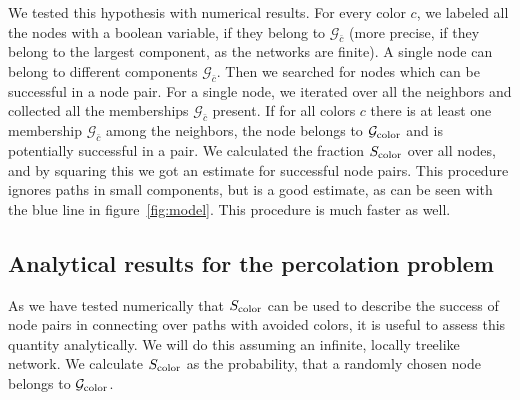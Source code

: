 \documentclass[aps, pre, onecolumn, a4paper, floatfix]{revtex4}
\begin{document}
We tested this hypothesis with numerical results. For every color $c$, we labeled all the 
nodes with a boolean variable, if they belong to ${\mathcal G}_{\bar c}$ (more precise, if they 
belong to the largest component, as the networks are finite). A single node can 
belong to different components ${\mathcal G}_{\bar c}$. Then we searched for 
nodes which can be successful in a node pair. For a single node, we iterated over 
all the neighbors and collected all the memberships ${\mathcal G}_{\bar c}$ present. If for 
all colors $c$ there is at least one membership ${\mathcal G}_{\bar c}$ among the neighbors, 
the node belongs to ${\mathcal G}_{\rm color}$ and is
potentially successful in a pair. We calculated the 
fraction $S_{\rm color}$ over all nodes, and by squaring this we got an estimate for 
successful node pairs. This procedure ignores paths in small components, but 
is a good estimate, as can be seen with the blue line in figure~\ref{fig:model}. 
This procedure is much faster as well.


\subsection{Analytical results for the percolation problem}

As we have tested numerically that $S_{\rm color}$ can be used to describe the success of node 
pairs in connecting over paths with avoided colors, it is useful to assess this quantity 
analytically. We will do this assuming an infinite, locally treelike network. 
We calculate $S_{\rm color}$ as the probability, that a randomly chosen node belongs to 
${\mathcal G}_{\rm color}$. 
\end{document}
